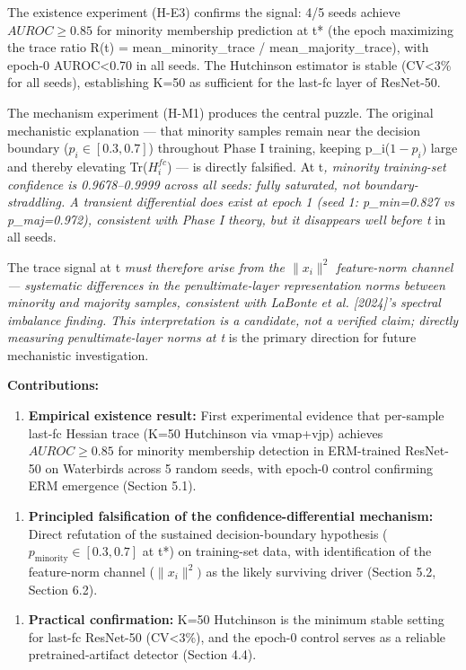 The existence experiment (H-E3) confirms the signal: 4/5 seeds achieve $AUROC\geq 0.85$ for minority membership prediction at t* (the epoch maximizing the trace ratio R(t) = mean\_minority\_trace / mean\_majority\_trace), with epoch-0 AUROC<0.70 in all seeds. The Hutchinson estimator is stable (CV<3\% for all seeds), establishing K=50 as sufficient for the last-fc layer of ResNet-50.

The mechanism experiment (H-M1) produces the central puzzle. The original mechanistic explanation --- that minority samples remain near the decision boundary ($p_i\in [0.3,0.7]$) throughout Phase I training, keeping p\_i($1-p_{i})$ large and thereby elevating Tr($H_i^{fc}$) --- is directly falsified. At t\textit{, minority training-set confidence is 0.9678--0.9999 across all seeds: fully saturated, not boundary-straddling. A transient differential does exist at epoch 1 (seed 1: p\_min=0.827 vs p\_maj=0.972), consistent with Phase I theory, but it disappears well before t} in all seeds.

The trace signal at t\textit{ must therefore arise from the $\|x_{i}\|^2$ feature-norm channel --- systematic differences in the penultimate-layer representation norms between minority and majority samples, consistent with LaBonte et al. [2024]'s spectral imbalance finding. This interpretation is a candidate, not a verified claim; directly measuring penultimate-layer norms at t} is the primary direction for future mechanistic investigation.

\textbf{Contributions:}

\begin{enumerate}
\item \textbf{Empirical existence result:} First experimental evidence that per-sample last-fc Hessian trace (K=50 Hutchinson via vmap+vjp) achieves $AUROC\geq 0.85$ for minority membership detection in ERM-trained ResNet-50 on Waterbirds across 5 random seeds, with epoch-0 control confirming ERM emergence (Section 5.1).
\end{enumerate}

\begin{enumerate}
\item \textbf{Principled falsification of the confidence-differential mechanism:} Direct refutation of the sustained decision-boundary hypothesis ($p_{\text{minority}}\in [0.3,0.7]$ at t*) on training-set data, with identification of the feature-norm channel ($\|x_{i}\|^{2})$ as the likely surviving driver (Section 5.2, Section 6.2).
\end{enumerate}

\begin{enumerate}
\item \textbf{Practical confirmation:} K=50 Hutchinson is the minimum stable setting for last-fc ResNet-50 (CV<3\%), and the epoch-0 control serves as a reliable pretrained-artifact detector (Section 4.4).
\end{enumerate}
